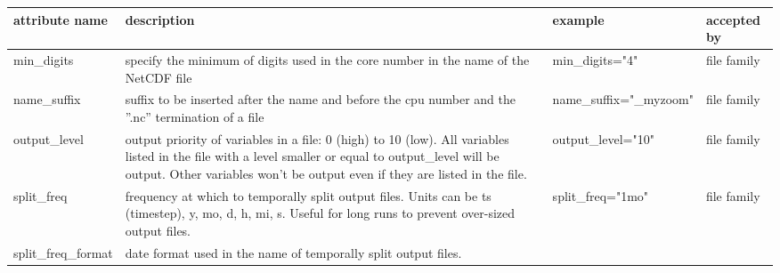 \documentclass[../tex_main/NEMO_manual]{subfiles}
\begin{document}
\begin{table} \scriptsize
	\begin{tabularx}{\textwidth}{|l|X|l|l|} \hline
		attribute name                                                                                       &
		description                                                                                          &
		example                                                                                              &
		accepted by                            \\ \hline \hline
		min\_digits                                                                                          &
		specify the minimum of digits used in the core number in the name of the NetCDF file                 &
		min\_digits="4"                                                                                      &
		file family                            \\ \hline
		name\_suffix                                                                                         &
		suffix to be inserted after the name and before the cpu number and the ''.nc'' termination of a file &
		name\_suffix="\_myzoom"                                                                              &
		file family                            \\ \hline
		output\_level                                                                                        &
		output priority of variables in a file: 0 (high) to 10 (low).
		All variables listed in the file with a level smaller or equal to output\_level will be output.
		Other variables won't be output even if they are listed in the file.                                 &
		output\_level="10"                                                                                   &
		file family                            \\ \hline
		split\_freq                                                                                          &
		frequency at which to temporally split output files.
		Units can be ts (timestep), y, mo, d, h, mi, s.
		Useful for long runs to prevent over-sized output files.                                             &
		split\_freq="1mo"                                                                                    &
		file family                            \\ \hline
		split\_freq\-\_format                                                                                &
		date format used in the name of temporally split output files.

\end{tabularx}
\end{table}
\end{document}
